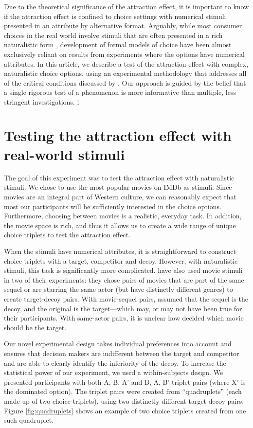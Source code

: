 \documentclass[12pt, a4paper]{article}
\begin{document}
Due to the theoretical significance of the attraction effect, it is important to know if the attraction effect is confined to choice settings with numerical stimuli presented in an attribute by alternative format. Arguably, while most consumer choices in the real world involve stimuli that are often presented in a rich naturalistic form \cite{Bhatia2018b}, development of formal models of choice have been almost exclusively reliant on results from experiments where the options have numerical attributes. 
In this article, we describe a test of the attraction effect with complex, naturalistic choice options, using an experimental methodology that addresses all of the critical conditions discussed by . Our approach is guided by the belief that a single rigorous test of a phenomenon is more informative than multiple, less stringent investigations.  i

\section*{Testing the attraction effect with real-world stimuli}

The goal of this experiment was to test the attraction effect with naturalistic stimuli. We chose to use the most popular movies on IMDb as stimuli. Since movies are an integral part of Western culture, we can reasonably expect that most our participants will be sufficiently interested in the choice options. Furthermore, choosing between movies is a realistic, everyday task. In addition, the movie space is rich, and thus it allows us to create a wide range of unique choice triplets to test the attraction effect.

When the stimuli have numerical attributes, it is straightforward to construct choice triplets with a target, competitor and decoy. However, with naturalistic stimuli, this task is significantly more complicated.  have also used movie stimuli in two of their experiments: they chose pairs of movies that are part of the same sequel or are starring the same actor (but have distinctly different genres) to create target-decoy pairs. With movie-sequel pairs, \citeauthor{Frederick2014} assumed that the sequel is the decoy, and the original is the target---which may, or may not have been true for their participants. With same-actor pairs, it is unclear how \citeauthor{Frederick2014} decided which movie should be the target.

Our novel experimental design takes individual preferences into account and ensures that decision makers are indifferent between the target and competitor and are able to clearly identify the inferiority of the decoy. To increase the statistical power of our experiment, we used a within-subjects design. We presented participants with both A, B, A' and B, A, B' triplet pairs (where X' is the dominated option). The triplet pairs were created from ``quadruplets'' (each made up of two choice triplets), using two distinctly different target-decoy pairs. Figure \ref{fig:quadruplets} shows an example of two choice triplets created from one such quadruplet.
\end{document}
